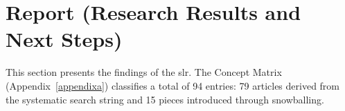 
	\section{Report (Research Results and Next Steps)}\label{sec:results}




\begin{toreview}

	This section presents the findings of the \gls{slr}. The Concept Matrix (Appendix~\ref{appendixa}) classifies a total of 94 entries: 79 articles derived from the systematic search string and 15 pieces introduced through snowballing.

\end{toreview}

	
	